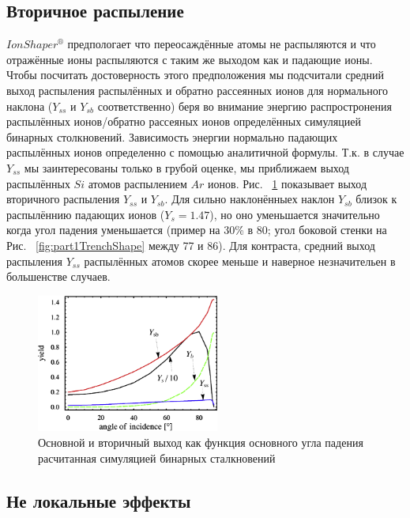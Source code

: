 \documentclass[a4paper,fontsize=12pt]{article}
\begin{document}
\subsection{Вторичное распыление}

$IonShaper^{®}$ предпологает что переосаждённые атомы не распыляются и что отражённые ионы распыляются с таким же выходом как и падающие ионы. Чтобы посчитать достоверность этого предположения мы подсчитали средний выход распыления распылённых и обратно рассеянных ионов для нормального наклона ($Y_{ss}$ и $Y_{sb}$ соответственно) беря во внимание энергию распростронения распылённых ионов/обратно рассеяных ионов определённых симуляцией бинарных столкновений. Зависимость энергии нормально падающих распылённых ионов определенно с помощью аналитичной формулы. Т.к. в случае $Y_{ss}$ мы заинтересованы только в грубой оценке, мы приближаем выход распылённых $Si$ атомов распылением $Ar$ ионов.
Рис. ~\ref{fig:part1Yield} показывает выход вторичного распыления $Y_{ss}$ и $Y_{sb}$. Для сильно наклонённыех наклон $Y_{sb}$ близок к распылённию падающих ионов
($Y_{s} = 1.47$),
но оно уменьшается значительно когда угол падения уменьшается (пример на 30\% в 80; угол боковой стенки на Рис. ~\ref{fig:part1TrenchShape} между 77 и 86). Для контраста, средний выход распыления $Y_{ss}$ распылённых атомов скорее меньше и наверное незначительен в большенстве случаев.


\begin{figure}[h]
    \centering
    \includegraphics[width=6cm]{images/part1/3.eps}
    \caption{Основной и вторичный выход как функция основного угла падения расчитанная симуляцией бинарных сталкновений }
    \label{fig:part1Yield}
\end{figure}

\subsection{Не локальные эффекты}
\end{document}
